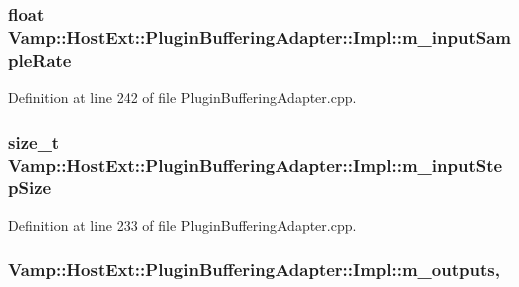 \subsubsection[{\texorpdfstring{m\+\_\+input\+Sample\+Rate}{m_inputSampleRate}}]{\setlength{\rightskip}{0pt plus 5cm}float Vamp\+::\+Host\+Ext\+::\+Plugin\+Buffering\+Adapter\+::\+Impl\+::m\+\_\+input\+Sample\+Rate\hspace{0.3cm}{\ttfamily [protected]}}\hypertarget{class_vamp_1_1_host_ext_1_1_plugin_buffering_adapter_1_1_impl_acc747b4e448a316346f9f59e2c85dcfc}{}\label{class_vamp_1_1_host_ext_1_1_plugin_buffering_adapter_1_1_impl_acc747b4e448a316346f9f59e2c85dcfc}


Definition at line 242 of file Plugin\+Buffering\+Adapter.\+cpp.

\subsubsection[{\texorpdfstring{m\+\_\+input\+Step\+Size}{m_inputStepSize}}]{\setlength{\rightskip}{0pt plus 5cm}size\+\_\+t Vamp\+::\+Host\+Ext\+::\+Plugin\+Buffering\+Adapter\+::\+Impl\+::m\+\_\+input\+Step\+Size\hspace{0.3cm}{\ttfamily [protected]}}\hypertarget{class_vamp_1_1_host_ext_1_1_plugin_buffering_adapter_1_1_impl_a6140f55c9120314194d3e73a54b25139}{}\label{class_vamp_1_1_host_ext_1_1_plugin_buffering_adapter_1_1_impl_a6140f55c9120314194d3e73a54b25139}


Definition at line 233 of file Plugin\+Buffering\+Adapter.\+cpp.

\subsubsection[{\texorpdfstring{m\+\_\+outputs}{m_outputs}}]{ Vamp\+::\+Host\+Ext\+::\+Plugin\+Buffering\+Adapter\+::\+Impl\+::m\+\_\+outputs\hspace{0.3cm}{\ttfamily [mutable]}, {\ttfamily [protected]}}\hypertarget{class_vamp_1_1_host_ext_1_1_plugin_buffering_adapter_1_1_impl_ae65848a6788b5c984635d252fbc8365c}{}\label{class_vamp_1_1_host_ext_1_1_plugin_buffering_adapter_1_1_impl_ae65848a6788b5c984635d252fbc8365c}


